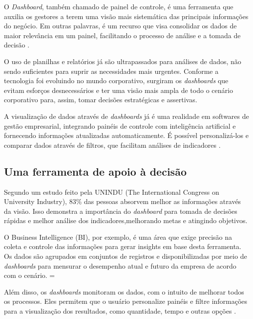 \indent
\par O \textit{Dashboard}, também chamado de painel de controle, é uma ferramenta que auxilia os gestores a terem uma visão mais sistemática das principais informações do negócio. Em outras palavras, é um recurso que visa consolidar os dados de maior relevância em um painel, facilitando o processo de análise e a tomada de decisão \cite{Intelipost}.

\par O uso de planilhas e relatórios já são ultrapassados para análises de dados, não sendo suficientes para suprir as necessidades mais urgentes. Conforme a tecnologia foi evoluindo no mundo corporativo, surgiram os \textit{dashboards} que evitam esforços desnecessários e ter uma visão mais ampla de todo o cenário corporativo para, assim, tomar decisões estratégicas e assertivas.

\par A visualização de dados através de \textit{dashboards} já é uma realidade em softwares de gestão empresarial, integrando painéis de controle com inteligência artificial e fornecendo informações atualizadas automaticamente. É possível personalizá-los e comparar dados através de filtros, que facilitam análises de indicadores \cite{Tecnicon}.


\subsection{Uma ferramenta de apoio à decisão}

\indent
\par Segundo um estudo feito pela UNINDU (The International Congress on University Industry), 83\% das pessoas absorvem melhor as informações através da visão. Isso demonstra a importância do \textit{dashboard} para tomada de decisões rápidas e melhor análise dos indicadores,melhorando metas e atingindo objetivos.

\par O Business Intelligence (BI), por exemplo, é uma área que exige precisão na coleta e controle das informações para gerar insights em base desta ferramenta. Os dados são agrupados em conjuntos de registros e disponibilizadas por meio de \textit{dashboards} para mensurar o desempenho atual e futuro da empresa de acordo com o cenário.
=
\par Além disso, os \textit{dashboards} monitoram os dados, com o intuito de melhorar todos os processos. Eles permitem que o usuário personalize painéis e filtre informações para a visualização dos resultados, como quantidade, tempo e outras opções \cite{Tecnicon}.

